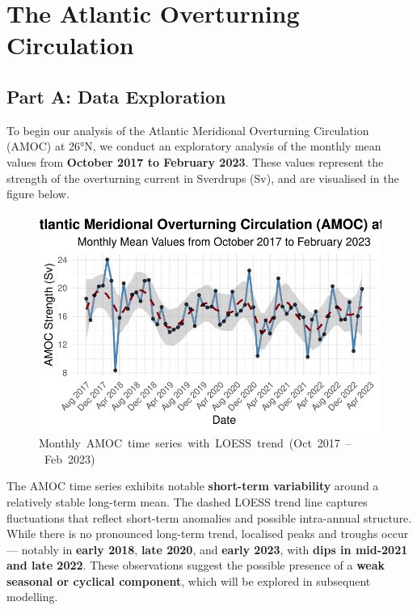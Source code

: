 \documentclass[
  11pt,
]{article}
\begin{document}
\newpage

\section{The Atlantic Overturning
Circulation}\label{the-atlantic-overturning-circulation}

\subsection{Part A: Data Exploration}\label{part-a-data-exploration}

To begin our analysis of the Atlantic Meridional Overturning Circulation
(AMOC) at 26°N, we conduct an exploratory analysis of the monthly mean
values from \textbf{October 2017 to February 2023}. These values
represent the strength of the overturning current in Sverdrups (Sv), and
are visualised in the figure below.

\begin{figure}[H]

{\centering \includegraphics{project_files/figure-pdf/fig-monthly amoc-1.pdf}

}

\caption{Monthly~AMOC~time~series~with~LOESS~trend~(Oct~2017~--~Feb~2023)}

\end{figure}%

The AMOC time series exhibits notable \textbf{short-term variability}
around a relatively stable long-term mean. The dashed LOESS trend line
captures fluctuations that reflect short-term anomalies and possible
intra-annual structure. While there is no pronounced long-term trend,
localised peaks and troughs occur --- notably in \textbf{early 2018},
\textbf{late 2020}, and \textbf{early 2023}, with \textbf{dips in
mid-2021 and late 2022}. These observations suggest the possible
presence of a \textbf{weak seasonal or cyclical component}, which will
be explored in subsequent modelling.
\end{document}
